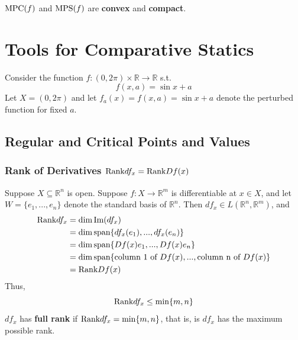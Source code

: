 \documentclass[11pt]{elegantbook}
\begin{document}
\begin{corollary}
    $\textnormal{MPC}(f)$ and $\textnormal{MPS}(f)$ are \textbf{convex} and \textbf{compact}.
\end{corollary}




\chapter{Tools for Comparative Statics}
Consider the function $f:(0,2\pi) \times \mathbb{R} \rightarrow \mathbb{R}$ s.t. $$f(x,a)=\sin x+a$$
Let $X=(0,2\pi)$ and let $f_a(x) = f(x, a) = \sin x + a$ denote the perturbed function for fixed $a$.



\section{Regular and Critical Points and Values}
\subsection{Rank of Derivatives $\textnormal{Rank} df_x=\textnormal{Rank} Df(x)$}
Suppose $X \subseteq \mathbb{R}^n$ is open. Suppose $f : X \rightarrow \mathbb{R}^m$ is differentiable at $x \in X$, and let $W = \{e_1, . . . , e_n\}$ denote the standard basis of $\mathbb{R}^n$. Then $df_x \in L(\mathbb{R}^n, \mathbb{R}^m)$, and
\begin{equation}
    \begin{aligned}
        \textnormal{Rank} df_x &= \dim \textnormal{Im}(df_x)\\
        &= \dim \textnormal{span}\{df_x(e_1), . . . , df_x(e_n)\}\\
        &= \dim \textnormal{span}\{Df(x)e_1, . . . , Df(x)e_n\}\\
        &= \dim \textnormal{span}\{\textnormal{column 1 of }Df(x), . . . , \textnormal{column n of }Df(x)\}\\
        &=\textnormal{Rank} Df(x)
    \end{aligned}
    \nonumber
\end{equation}
Thus,
$$\textnormal{Rank} df_x\leq\min\{m,n\}$$
$df_x$ has \textbf{full rank} if $\textnormal{Rank} df_x=\min\{m,n\}$, that is, is $df_x$ has the maximum possible rank.
\end{document}
